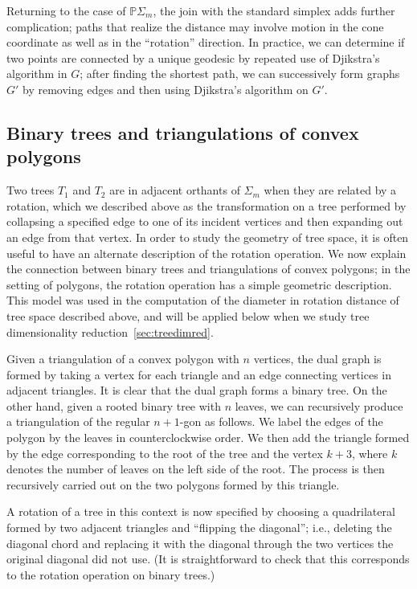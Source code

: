 \documentclass[a4paper,11pt]{article}
\begin{document}
Returning to the case of $\mathbb{P}\Sigma_m$, the join with the standard simplex adds further complication; paths that realize the distance may involve motion in the cone coordinate as well as in the ``rotation'' direction.
In practice, we can determine if two points are connected by a unique geodesic by repeated use of Djikstra's algorithm in $G$; after finding the shortest path, we can successively form graphs $G'$ by removing edges and then using Djikstra's algorithm on $G'$.

\subsection{Binary trees and triangulations of convex polygons}

Two trees $T_1$ and $T_2$ are in adjacent orthants of $\Sigma_m$ when they are related by a rotation, which we described above as the transformation on a tree performed by collapsing a specified edge to one of its incident vertices and then expanding out an edge from that vertex.
In order to study the geometry of tree space, it is often useful to have an alternate description of the rotation operation.
We now explain the connection between binary trees and triangulations of convex polygons; in the setting of polygons, the rotation operation has a simple geometric description.
This model was used in the computation of the diameter in rotation distance of tree space described above, and will be applied below when we study tree dimensionality reduction~\ref{sec:treedimred}.

Given a triangulation of a convex polygon with $n$ vertices, the dual graph is formed by taking a vertex for each triangle and an edge connecting vertices in adjacent triangles.
It is clear that the dual graph forms a binary tree.
On the other hand, given a rooted binary tree with $n$ leaves, we can recursively produce a triangulation of the regular $n+1$-gon as follows.
We label the edges of the polygon by the leaves in counterclockwise order.  
We then add the triangle formed by the edge corresponding to the root of the tree and the vertex $k+3$, where $k$ denotes the number of leaves on the left side of the root.
The process is then recursively carried out on the two polygons formed by this triangle.

A rotation of a tree in this context is now specified by choosing a quadrilateral formed by two adjacent triangles and ``flipping the diagonal''; i.e., deleting the diagonal chord and replacing it with the diagonal through the two vertices the original diagonal did not use.
(It is straightforward to check that this corresponds to the rotation operation on binary trees.)
\end{document}
